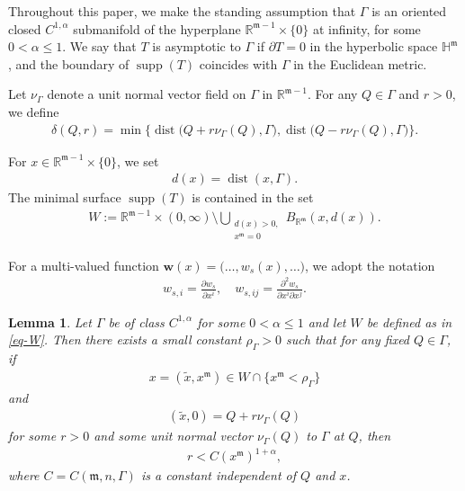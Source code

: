 \documentclass[11pt,reqno]{amsart}
\newcommand{\fm}{\mathfrak{m}}
\renewcommand{\leq}{\leqslant}
\newtheorem{lemma}[theorem]{Lemma}
\theoremstyle{definition}
\numberwithin{equation}{section}
\begin{document}
Throughout this paper, we make the standing assumption that $\Gamma$ is an oriented closed $C^{1,\alpha}$ submanifold of the hyperplane $\mathbb{R}^{\fm-1} \times \{0\}$ at infinity, for some $0 < \alpha \leq 1$. We say that $T$ is asymptotic to $\Gamma$ if $\partial T = 0$ in the hyperbolic space $\mathbb{H}^\fm$, and the boundary of $\operatorname{supp}(T)$ coincides with $\Gamma$ in the Euclidean metric.



Let $\nu_\Gamma$ denote a unit normal vector field on $\Gamma$ in $\mathbb{R}^{\fm-1}$. For any $Q\in \Gamma$ and $r>0$, we define
\begin{align}
    \delta(Q, r) = \min \bigl\{ \operatorname{dist}\bigl(Q+r\nu_\Gamma(Q), \Gamma\bigr), \operatorname{dist}\bigl(Q-r\nu_\Gamma(Q), \Gamma\bigr) \bigr\}.
\end{align}

For $x\in \mathbb{R}^{\fm-1}\times \{0\}$, we set
\begin{align}
    d(x) = \operatorname{dist}(x, \Gamma).
\end{align}
The minimal surface $\operatorname{supp}(T)$ is contained in the set
\begin{align}\label{eq-W}
    W := \mathbb{R}^{\fm-1}\times (0, \infty)  \setminus \bigcup_{\substack{d(x)>0, \\ x^\fm=0}} B_{\mathbb{R}^\fm}(x,d(x)).
\end{align}

For a multi-valued function $\mathbf{w}(x) = \bigl(\dots, w_s(x), \dots\bigr)$, we adopt the notation
\begin{align}\label{eq-derivative}
    w_{s, i} = \frac{\partial w_s}{\partial x^i}, \quad w_{s, ij} = \frac{\partial^2 w_s}{\partial x^i \partial x^j}.
\end{align}

\begin{lemma}\label{lem-rho-Gamma}
Let $\Gamma$ be of class $C^{1,\alpha}$ for some $0<\alpha\leq 1$ and let $W$ be defined as in \eqref{eq-W}. Then there exists a small constant $\rho_\Gamma>0$ such that for any fixed $Q\in \Gamma$, if
\begin{align}
x=(\tilde x, x^\fm) \in W \cap \{x^\fm <\rho_\Gamma \}    
\end{align}
 and
\begin{align}\label{eq-a-r}
(\tilde x,0) = Q+r\nu_\Gamma(Q)
\end{align}
for some $r>0$ and some unit normal vector $\nu_\Gamma(Q)$ to $\Gamma$ at $Q$, then
\begin{align}\label{eq-delta-1}
r < C (x^\fm)^{1+\alpha},
\end{align}
where $C = C(\fm,n,\Gamma)$ is a constant independent of $Q$ and $x$.
\end{lemma}
\end{document}
